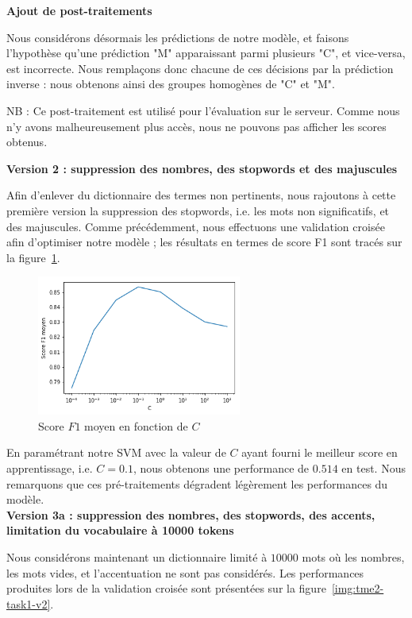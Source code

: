 \documentclass[a4paper]{article}
\newcommand{\figref}[1]{figure~\ref{#1}}
\begin{document}
\textbf{Ajout de post-traitements}

Nous considérons désormais les prédictions de notre modèle, et faisons
l'hypothèse qu'une prédiction "M" apparaissant parmi plusieurs "C", et
vice-versa, est incorrecte. Nous remplaçons donc chacune de ces décisions par la
prédiction inverse : nous obtenons ainsi des groupes homogènes de "C" et "M".

NB : Ce post-traitement est utilisé pour l'évaluation sur le serveur. Comme nous
n'y avons malheureusement plus accès, nous ne pouvons pas afficher les scores
obtenus.


\textbf{Version 2 : suppression des nombres, des stopwords et des majuscules}

Afin d'enlever du dictionnaire des termes non pertinents, nous rajoutons à cette
première version la suppression des stopwords, i.e. les mots non significatifs,
et des majuscules. Comme précédemment, nous effectuons
une validation croisée afin d'optimiser notre modèle ; les résultats en termes
de score F1 sont tracés sur la \figref{img:tme2-task1-v1}.

\begin{figure}[H]
	\center 
	\includegraphics[width=0.6\textwidth]{images/tme2/task1_v1.png}
    \caption{Score $F1$ moyen en fonction de $C$}
    \label{img:tme2-task1-v1}
\end{figure}

En paramétrant notre SVM avec la valeur de $C$ ayant fourni le meilleur score en
apprentissage, i.e. $C=0.1$, nous obtenons une performance de $0.514$ en test.
Nous remarquons que ces pré-traitements dégradent légèrement les performances du
modèle. \\

\textbf{Version 3a : suppression des nombres, des stopwords, des accents,
limitation du vocabulaire à 10000 tokens}

Nous considérons maintenant un dictionnaire limité à $10000$ mots où les
nombres, les mots vides, et l'accentuation ne sont pas considérés. Les
performances produites lors de la validation croisée sont présentées sur la
\figref{img:tme2-task1-v2}.
\end{document}
